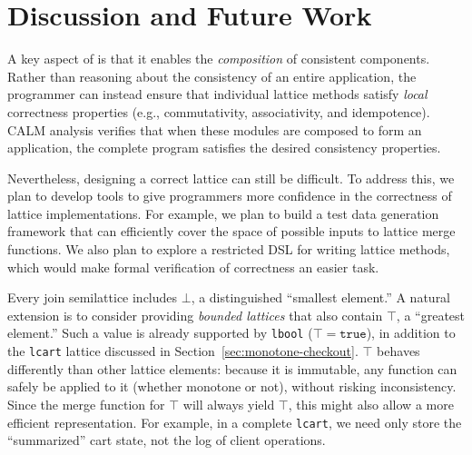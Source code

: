 \section{Discussion and Future Work}
\label{sec:discussion}
A key aspect of \lang is that it enables the \emph{composition} of consistent
components. Rather than reasoning about the consistency of an entire
application, the programmer can instead ensure that individual lattice methods
satisfy \emph{local} correctness properties (e.g., commutativity, associativity,
and idempotence). CALM analysis verifies that when these modules are composed to
form an application, the complete program satisfies the desired consistency
properties.

Nevertheless, designing a correct lattice can still be difficult. To address
this, we plan to develop tools to give programmers more confidence in the
correctness of lattice implementations. For example, we plan to build a test
data generation framework that can efficiently cover the space of possible
inputs to lattice merge functions. We also plan to explore a restricted DSL for
writing lattice methods, which would make formal verification of correctness an
easier task.

Every join semilattice includes $\bot$, a distinguished ``smallest element.'' A
natural extension is to consider providing \emph{bounded lattices} that also
contain $\top$, a ``greatest element.'' Such a value is already supported by
\texttt{lbool} ($\top = \mathtt{true}$), in addition to the \texttt{lcart}
lattice discussed in Section~\ref{sec:monotone-checkout}. $\top$ behaves
differently than other lattice elements: because it is immutable, any function
can safely be applied to it (whether monotone or not), without risking
inconsistency. Since the merge function for $\top$ will always yield $\top$,
this might also allow a more efficient representation.  For example, in a
complete \texttt{lcart}, we need only store the ``summarized'' cart state, not
the log of client operations.


